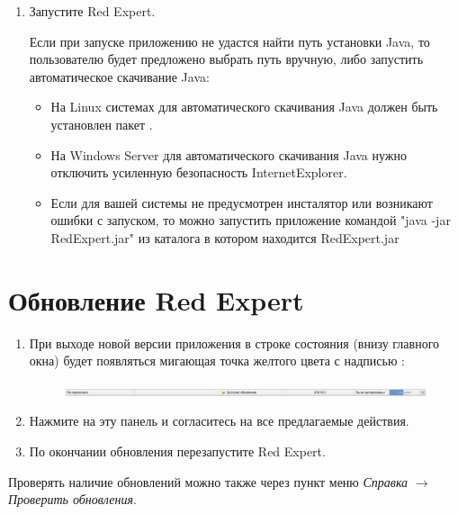 \begin{enumerate}[leftmargin=15pt]
\item Запустите Red Expert.

\begin{redremark}
Если при запуске приложению не удастся найти путь установки Java, то пользователю будет предложено выбрать путь вручную, либо запустить автоматическое скачивание Java:
\begin{itemize}[leftmargin=15pt]
	\item На Linux системах для автоматического скачивания Java должен быть установлен пакет .
	\item На Windows Server для автоматического скачивания Java нужно отключить усиленную безопасность InternetExplorer.
	\item Если для вашей системы не предусмотрен инсталятор или возникают ошибки с запуском, то можно запустить приложение командой "java -jar RedExpert.jar" из каталога в котором находится RedExpert.jar
\end{itemize}
\end{redremark}
\end{enumerate}	

\newpage

\section{Обновление Red Expert}
\begin{enumerate}[leftmargin=25pt]
\item При выходе новой версии приложения в строке состояния (внизу главного окна)
будет появляться мигающая точка желтого цвета с надписью :
\begin{figure}[H]
	\begin{flushright}
		\includegraphics[width = 0.94\linewidth]{img/status_bar.png}
	\end{flushright}
\end{figure}

\item Нажмите на эту панель и согласитесь на все предлагаемые действия.

\item По окончании обновления перезапустите Red Expert.
\end{enumerate}	

Проверять наличие обновлений можно также через пункт меню \textit{Справка} $\rightarrow$ \textit{Проверить обновления}.


